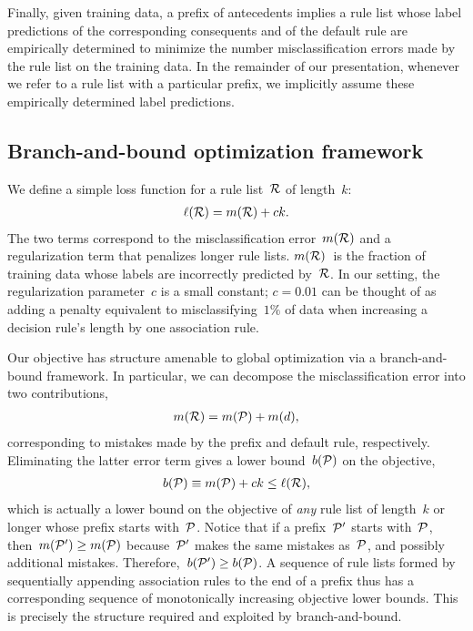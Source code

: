 Finally, given training data, a prefix of antecedents implies a rule list
whose label predictions of the corresponding consequents and of the default rule
are empirically determined to minimize the number misclassification errors made
by the rule list on the training data.
%
In the remainder of our presentation, whenever we refer to a rule list with a
particular prefix, we implicitly assume these empirically determined label predictions.

\subsection{Branch-and-bound optimization framework}

We define a simple loss function for a rule list~${\mathcal R}$ of length~$k$:
\begin{align}
\ell(\RL) = m(\RL) + c k.
\label{eq:objective}
\end{align}
The two terms correspond to the misclassification error~$m({\mathcal R})$
and a regularization term that penalizes longer rule lists.
%
$m({\mathcal R})$~is the fraction of training data whose labels are
incorrectly predicted by~${\mathcal R}$.
%
In our setting, the regularization parameter~$c$ is a small constant;
\eg ${c = 0.01}$ can be thought of as adding a penalty equivalent to misclassifying~$1\%$
of data when increasing a decision rule's length by one association rule.

Our objective has structure amenable to global optimization via a branch-and-bound framework.
%
In particular, we can decompose the misclassification error into two contributions, 
\begin{align}
m(\RL) = m(\Prefix) + m(d),
\end{align}
corresponding to mistakes made by the prefix and default rule, respectively.
%
Eliminating the latter error term gives a lower bound~$b({\mathcal P})$ on the objective,
\begin{align}
b(\Prefix) \equiv m(\Prefix) + c k \le \ell(\RL),
\end{align}
which is actually a lower bound on the objective of \emph{any} rule list
of length~$k$ or longer whose prefix starts with~${\mathcal P}$.
%
Notice that if a prefix~${\mathcal P}'$ starts with~${\mathcal P}$, then~${m({\mathcal P}') \ge m({\mathcal P})}$
because~${\mathcal P}'$ makes the same mistakes as~${\mathcal P}$, and possibly additional mistakes.
%
Therefore,~${b({\mathcal P}') \ge b({\mathcal P})}$.
%
A sequence of rule lists formed by sequentially appending association rules
to the end of a prefix thus has a corresponding sequence of
monotonically increasing objective lower bounds.
%
This is precisely the structure required and exploited by branch-and-bound.

